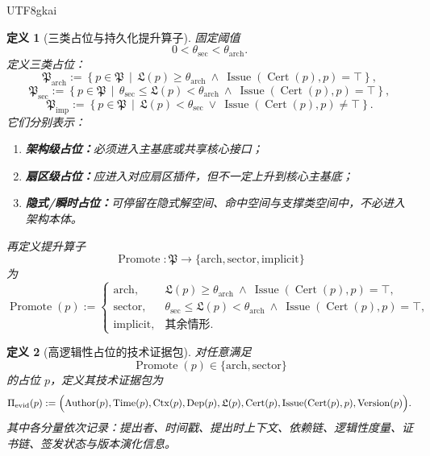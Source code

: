 \documentclass[12pt]{article}
\newtheorem{definition}{定义}[section]
\newcommand{\Cert}{\operatorname{Cert}}
\newcommand{\Issue}{\operatorname{Issue}}
\newcommand{\Promote}{\operatorname{Promote}}
\begin{document}
\begin{CJK*}{UTF8}{gkai}
\begin{definition}[三类占位与持久化提升算子]
\label{def:tex37-ch16-promote}
固定阈值
\[
  0<\theta_{\mathrm{sec}}<\theta_{\mathrm{arch}}.
\]
定义三类占位：
\[
  \mathfrak P_{\mathrm{arch}}
  :=
  \left\{
    p\in\mathfrak P
    \,\middle|\,
    \mathfrak L(p)\ge \theta_{\mathrm{arch}}
    \ \wedge\
    \Issue(\Cert(p),p)=\top
  \right\},
\]
\[
  \mathfrak P_{\mathrm{sec}}
  :=
  \left\{
    p\in\mathfrak P
    \,\middle|\,
    \theta_{\mathrm{sec}}\le \mathfrak L(p)<\theta_{\mathrm{arch}}
    \ \wedge\
    \Issue(\Cert(p),p)=\top
  \right\},
\]
\[
  \mathfrak P_{\mathrm{imp}}
  :=
  \left\{
    p\in\mathfrak P
    \,\middle|\,
    \mathfrak L(p)<\theta_{\mathrm{sec}}
    \ \vee\
    \Issue(\Cert(p),p)\neq\top
  \right\}.
\]
它们分别表示：
\begin{enumerate}
  \item \textbf{架构级占位：}必须进入主基底或共享核心接口；
  \item \textbf{扇区级占位：}应进入对应扇区插件，但不一定上升到核心主基底；
  \item \textbf{隐式/瞬时占位：}可停留在隐式解空间、命中空间与支撑类空间中，不必进入架构本体。
\end{enumerate}

再定义提升算子
\[
  \Promote:\mathfrak P\to\{\mathrm{arch},\mathrm{sector},\mathrm{implicit}\}
\]
为
\[
  \Promote(p)
  :=
  \begin{cases}
    \mathrm{arch},
    &
    \mathfrak L(p)\ge \theta_{\mathrm{arch}}
    \ \wedge\
    \Issue(\Cert(p),p)=\top,\\[4pt]
    \mathrm{sector},
    &
    \theta_{\mathrm{sec}}\le \mathfrak L(p)<\theta_{\mathrm{arch}}
    \ \wedge\
    \Issue(\Cert(p),p)=\top,\\[4pt]
    \mathrm{implicit},
    &
    \text{其余情形}.
  \end{cases}
\]
\end{definition}

\begin{definition}[高逻辑性占位的技术证据包]
\label{def:tex37-ch16-evidence}
对任意满足
\[
  \Promote(p)\in\{\mathrm{arch},\mathrm{sector}\}
\]
的占位 $p$，定义其技术证据包为
\[
  \Pi_{\mathrm{evid}}(p)
  :=
  \Bigl(
    \operatorname{Author}(p),
    \operatorname{Time}(p),
    \operatorname{Ctx}(p),
    \operatorname{Dep}(p),
    \mathfrak L(p),
    \Cert(p),
    \Issue(\Cert(p),p),
    \operatorname{Version}(p)
  \Bigr).
\]
其中各分量依次记录：提出者、时间戳、提出时上下文、依赖链、逻辑性度量、证书链、签发状态与版本演化信息。
\end{definition}


\end{CJK*}
\end{document}
